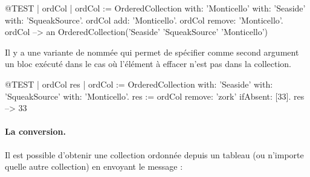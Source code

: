 \documentclass[a4paper,10pt,twoside]{book}
\begin{document}
\begin{code}{@TEST | ordCol | ordCol := OrderedCollection with: 'Monticello' with: 'Seaside' with: 'SqueakSource'.}
ordCol add: 'Monticello'.
ordCol remove: 'Monticello'.
ordCol --> an OrderedCollection('Seaside' 'SqueakSource' 'Monticello')
\end{code}

Il y a une variante de  nommée  qui permet de spécifier comme second argument un bloc exécuté dans le cas où l'élément à effacer n'est pas dans la collection. 

\begin{code}{@TEST | ordCol res | ordCol := OrderedCollection with: 'Seaside' with: 'SqueakSource' with: 'Monticello'.}
res := ordCol remove: 'zork' ifAbsent: [33].
res --> 33
\end{code}

\paragraph{La conversion.}
Il est possible d'obtenir une collection ordonnée  depuis
un tableau  (ou n'importe quelle autre collection) en envoyant le message :




\end{document}
